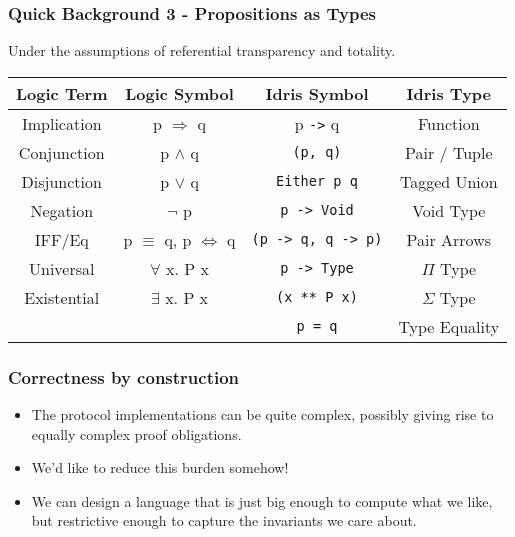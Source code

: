 \documentclass{beamer}
\begin{document}
\begin{frame}[fragile]
  \frametitle{Quick Background 3 - Propositions as Types}
  Under the assumptions of referential transparency and totality.
     \begin{table}[h!]
    \begin{tabular}{c|c|c|c}
    \textbf{Logic Term} & \textbf{Logic Symbol} & 
    \textbf{Idris Symbol} & \textbf{Idris Type} \\
    \hline
      Implication & p $\Rightarrow$ q & p \texttt{->} q
      & Function \\
      Conjunction & p $\land$ q & \texttt{(p, q)} 
      & Pair / Tuple \\
      Disjunction & p $\lor$ q & \texttt{Either p q}
      & Tagged Union\\
      Negation & $\lnot$ p & \texttt{p -> Void} &
      Void Type \\
      IFF/Eq & p $\equiv$ q, p $\iff$ q & 
        \texttt{(p -> q, q -> p)} 
      & Pair Arrows \\
      Universal & $\forall$ x. P x & 
      \texttt{p -> Type} & $\Pi$ Type \\
      Existential & $\exists$ x. P x 
      & \texttt{(x ** P x)} & $\Sigma$ Type \\
      \hline
       & & \texttt{p = q} & Type Equality
    \end{tabular}
  \end{table}
\end{frame}

\begin{frame}[fragile]
  \frametitle{Correctness by construction}
  \begin{itemize}
    \item The protocol implementations can be
          quite complex, possibly giving rise
          to equally complex proof obligations.
    \item We'd like to reduce this burden somehow!
    \item We can design a language that is just 
          big enough to compute what we like, 
          but restrictive enough to capture the
          invariants we care about.
  \end{itemize}
\end{frame}
\end{document}
